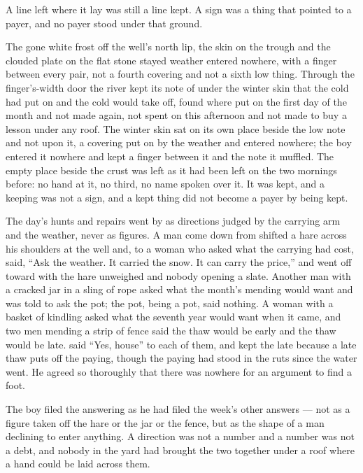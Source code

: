 A line left where it lay was still a line kept. A sign was a thing that pointed to a payer, and no payer stood under that ground.

The gone white frost off the well's north lip, the skin on the trough and the clouded plate on the flat stone stayed weather entered nowhere, with a finger between every pair, not a fourth covering and not a sixth low thing. Through the finger's-width door the river kept its note of  under the winter skin that the cold had put on and the cold would take off, found where put on the first day of the month and not made again, not spent on this afternoon and not made to buy a lesson under any roof. The winter skin sat on its own place beside the low note and not upon it, a covering put on by the weather and entered nowhere; the boy entered it nowhere and kept a finger between it and the note it muffled. The empty place beside the crust was left as it had been left on the two mornings before: no hand at it, no third, no name spoken over it. It was kept, and a keeping was not a sign, and a kept thing did not become a payer by being kept.

The day's hunts and repairs went by as directions judged by the carrying arm and the weather, never as figures. A man come down from  shifted a hare across his shoulders at the well and, to a woman who asked what the carrying had cost, said, “Ask the weather. It carried the snow. It can carry the price,” and went off toward  with the hare unweighed and nobody opening a slate. Another man with a cracked jar in a sling of rope asked what the month's mending would want and was told to ask the pot; the pot, being a pot, said nothing. A woman with a basket of kindling asked what the seventh year would want when it came, and two men mending a strip of fence said the thaw would be early and the thaw would be late.  said “Yes, house” to each of them, and kept the late because a late thaw puts off the paying, though the paying had stood in the ruts since the water went. He agreed so thoroughly that there was nowhere for an argument to find a foot.

The boy filed the answering as he had filed the week's other answers — not as a figure taken off the hare or the jar or the fence, but as the shape of a man declining to enter anything. A direction was not a number and a number was not a debt, and nobody in the yard had brought the two together under a roof where a hand could be laid across them.


